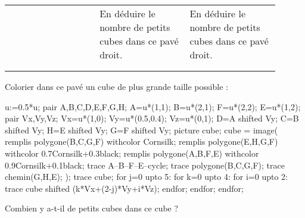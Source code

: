 \begin{changemargin}{-10mm}{-25mm}
\begin{activite}
\begin{tabular}{>{\centering\arraybackslash}p{0.3\linewidth}|>{\centering\arraybackslash}p{0.3\linewidth}|>{\centering\arraybackslash}p{0.3\linewidth}}
            &
            En déduire le nombre de petits cubes dans ce pavé droit.
            &
            En déduire le nombre de petits cubes dans ce pavé droit. \\
            &&\\
            \dotfill & \dotfill & \dotfill \\
        \end{tabular}
        \par
        Colorier dans ce pavé un cube de plus grande taille possible : 
        \begin{Geometrie}[CoinBG={(-u,-0.5u)},CoinHD={(5u,4u)}]
            u:=0.5*u;
            pair A,B,C,D,E,F,G,H;
            A=u*(1,1);
            B=u*(2,1);
            F=u*(2,2);
            E=u*(1,2);
            pair Vx,Vy,Vz;
            Vx=u*(1,0);
            Vy=u*(0.5,0.4);
            Vz=u*(0,1);
            D=A shifted Vy;
            C=B shifted Vy;
            H=E shifted Vy;
            G=F shifted Vy;
            picture cube;
            cube = image(
                remplis polygone(B,C,G,F) withcolor Cornsilk;
                remplis polygone(E,H,G,F) withcolor 0.7Cornsilk+0.3black;
                remplis polygone(A,B,F,E) withcolor 0.9Cornsilk+0.1black;
                trace A--B--F--E--cycle;
                trace polygone(B,C,G,F);
                trace chemin(G,H,E);
            );        
            trace cube;
            for j=0 upto 5:
                for k=0 upto 4:
                    for i=0 upto 2:
                        trace cube shifted (k*Vx+(2-j)*Vy+i*Vz);
                    endfor;
                endfor;
            endfor;
        \end{Geometrie}
        \par\medskip
        Combien y a-t-il de petits cubes dans ce cube ? \dotfill
    \end{activite} 
\end{changemargin}